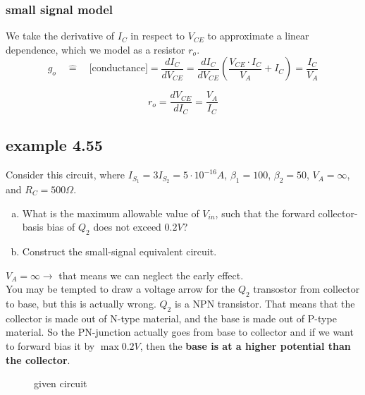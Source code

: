\documentclass[11ypt]{extarticle}
\begin{document}
\subsubsection{small signal model}

We take the derivative of $I_C$ in respect to $V_{CE}$ to approximate a linear dependence, which we model as a resistor $r_o$.
\begin{equation}
    g_o \quad \hat{=} \quad \text{[conductance]} = \frac{dI_C}{dV_{CE}} = \frac{dI_C}{dV_{CE}} \left( \frac{V_{CE} \cdot I_C}{V_A} + I_C \right) = \frac{I_C}{V_A}
\end{equation}

\begin{equation}
    r_o = \frac{dV_{CE}}{dI_C} = \frac{V_A}{I_C}
\end{equation}

\subsection{example 4.55}

Consider this circuit, where $I_{S_1} = 3 I_{S_2} = 5 \cdot 10^{-16} A$, $\beta_1 = 100$, $\beta_2 = 50$, $V_A = \infty$, and $R_C = 500 \Omega$. 
\\

\begin{enumerate}[a.]
\item 
What is the maximum allowable value of $V_{in}$, such that the forward collector-basis bias of $Q_2$ does not exceed $0.2 V$?
\item
Construct the small-signal equivalent circuit.
\end{enumerate}

$V_A = \infty \to$ that means we can neglect the early effect.
\\
You may be tempted to draw a voltage arrow for the $Q_2$ transostor from collector to base, but this is actually wrong. $Q_2$ is a NPN transistor. That means that the collector is made out of N-type material, and the base is made out of P-type material. So the PN-junction actually goes from base to collector and if we want to forward bias it by $\max 0.2 V$, then the \textbf{base is at a higher potential than the collector}. 

\begin{figure}[H]{} 
    \centering
    
    \caption{given circuit}
\end{figure}
\end{document}
